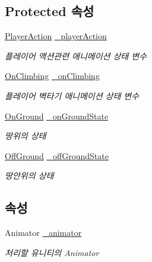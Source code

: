 \subsection*{Protected 속성}
\begin{DoxyCompactItemize}
\item 
\mbox{\hyperlink{class_player_state_a2909421d9f22a750c1b0eacfc9bafb3d}{Player\+Action}} \mbox{\hyperlink{class_player_state_a50343c632d4e11c55e97a58b4c9520ad}{\+\_\+player\+Action}}
\begin{DoxyCompactList}\small\item\em 플레이어 액션관련 애니메이션 상태 변수 \end{DoxyCompactList}\item 
\mbox{\hyperlink{class_player_state_a16e115e2b4c8d0420119d6ff2fe8b3bc}{On\+Climbing}} \mbox{\hyperlink{class_player_state_a779507cee79095e3bbd9e6e1f7f8b8a8}{\+\_\+on\+Climbing}}
\begin{DoxyCompactList}\small\item\em 플레이어 벽타기 애니메이션 상태 변수 \end{DoxyCompactList}\item 
\mbox{\hyperlink{class_state_ab9eb1c1d81f1903b8486d1275e78b68e}{On\+Ground}} \mbox{\hyperlink{class_state_ab3170df5e58f541f39edff3c1278d443}{\+\_\+on\+Ground\+State}}
\begin{DoxyCompactList}\small\item\em 땅위의 상태 \end{DoxyCompactList}\item 
\mbox{\hyperlink{class_state_a7d945e793324c017a973205564cf1a56}{Off\+Ground}} \mbox{\hyperlink{class_state_ad421039bfc35b46969f174c9617ab786}{\+\_\+off\+Ground\+State}}
\begin{DoxyCompactList}\small\item\em 땅안위의 상태 \end{DoxyCompactList}\end{DoxyCompactItemize}
\subsection*{속성}
\begin{DoxyCompactItemize}
\item 
Animator \mbox{\hyperlink{class_state_aff1dd03a1b3c63053b23371d6d70cd1a}{\+\_\+animator}}
\begin{DoxyCompactList}\small\item\em 처리할 유니티의 Animator \end{DoxyCompactList}\end{DoxyCompactItemize}


